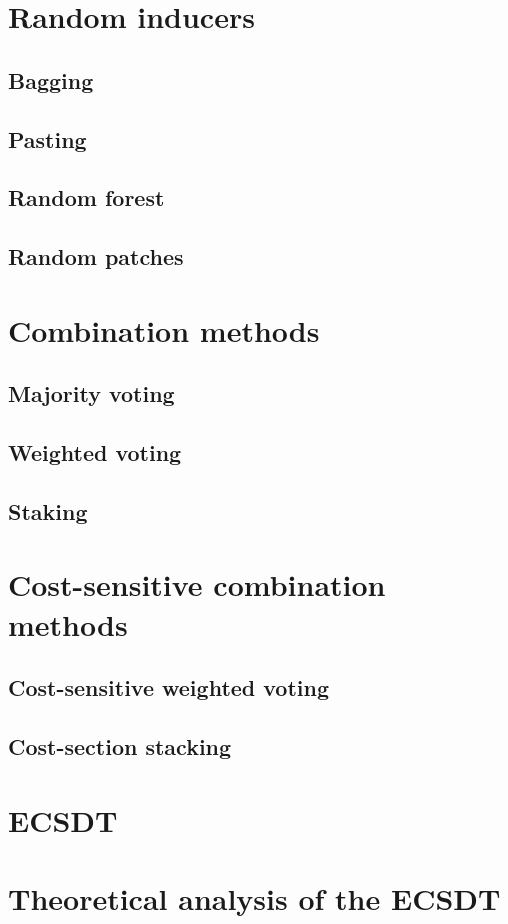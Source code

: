 \documentclass[twoside,openright,titlepage,numbers=noenddot,headinclude,%
               footinclude=true,cleardoublepage=empty,abstractoff,BCOR=5mm,%
               paper=a4,fontsize=11pt,ngerman,american,doublespace]{scrreprt}
\numberwithin{theorem}{chapter}
\numberwithin{definition}{chapter}
\numberwithin{algorithm}{chapter}
\numberwithin{figure}{chapter}
\numberwithin{table}{chapter}
\numberwithin{equation}{chapter}
\begin{document}
			\section{Random inducers}
				\subsection{Bagging}
				\subsection{Pasting}
				\subsection{Random forest}
				\subsection{Random patches}
			\section{Combination methods}
				\subsection{Majority voting}
				\subsection{Weighted voting}
				\subsection{Staking}
		\section{Cost-sensitive combination methods}
			\subsection{Cost-sensitive weighted voting}
			\subsection{Cost-section stacking}
		\section{ECSDT}
		\section{Theoretical analysis of the ECSDT}
\end{document}
